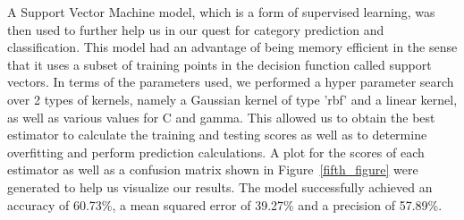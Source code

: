 \documentclass[10pt,twocolumn,letterpaper]{article}
\begin{document}
A Support Vector Machine model, which is a form of supervised learning, was then used to further help us in our quest for category prediction and classification. This model had an advantage of being memory efficient in the sense that it uses a subset of training points in the decision function called support vectors. In terms of the parameters used, we performed a hyper parameter search over 2 types of kernels, namely a Gaussian kernel of type 'rbf' and a linear kernel, as well as various values for C and gamma. This allowed us to obtain the best estimator to calculate the training and testing scores as well as to determine overfitting and perform prediction calculations. A plot for the scores of each estimator as well as a confusion matrix shown in Figure~\ref{fifth_figure} were generated to help us visualize our results. The model successfully achieved an accuracy of 60.73\%, a mean squared error of 39.27\% and a precision of 57.89\%.
\end{document}
